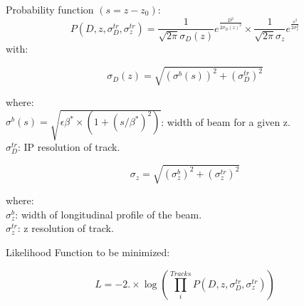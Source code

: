 \pagestyle{empty}





\noindent
{%



\noindent
Probability function $(s=z-z_0)$: 
\[P(D,z,\sigma_D^{tr},\sigma_z^{tr})= 
\frac{1}{\sqrt{2\pi}\sigma_D(z)} e^{\frac{D^2}{2\sigma_D(z)^2}}
\times \frac{1}{\sqrt{2\pi}\sigma_z} e^{\frac{s^2}{2\sigma_z^2}}
\]
with:

\[\sigma_{D}(z)= \sqrt{\left(\sigma^{b}(s)\right)^2 +(\sigma_D^{tr})^2} \]

\noindent
where:\\
$\sigma^{b}(s) = \sqrt{\epsilon \beta^* \times (1+(s/\beta^*)^2)}$: width of beam for a given z.\\
$\sigma_D^{tr}$: IP resolution of track. 

\[\sigma_z= \sqrt{(\sigma^{b}_z)^2 +(\sigma_z^{tr})^2} \]

\noindent
where:\\
$\sigma^{b}_z$: width of longitudinal profile of the beam.\\
$\sigma_z^{tr}$: z resolution of track. 

\vspace{1cm}
\noindent
Likelihood Function to be minimized: 


\[L= -2.\times  \log\left(\prod_{i}^{Tracks} P(D,z,\sigma_D^{tr},\sigma_z^{tr})\right)\]


}



